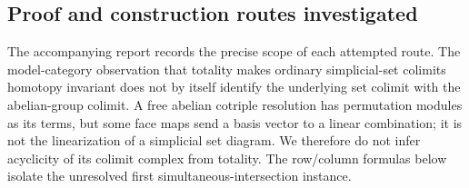 \subsection{Proof and construction routes investigated}
The accompanying report records the precise scope of each attempted
route. The model-category observation that totality makes ordinary
simplicial-set colimits homotopy invariant does not by itself identify
the underlying set colimit with the abelian-group colimit. A free
abelian cotriple resolution has permutation modules as its terms, but
some face maps send a basis vector to a linear combination; it is not
the linearization of a simplicial set diagram. We therefore do not infer
acyclicity of its colimit complex from totality. The row/column formulas
below isolate the unresolved first simultaneous-intersection instance.
